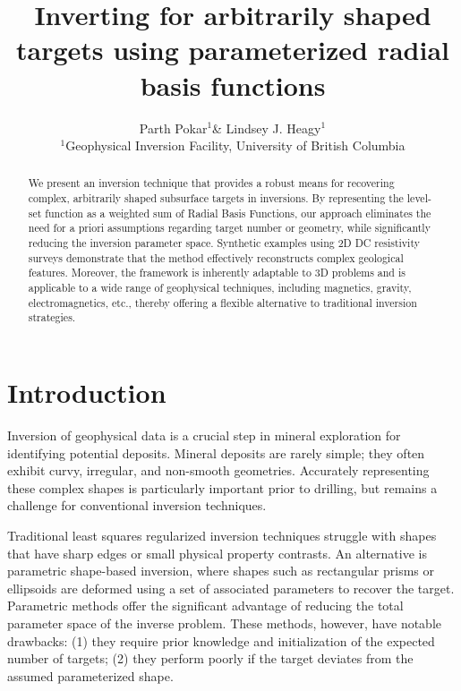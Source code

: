 \documentclass{segabs}
\begin{document}
\title{Inverting for arbitrarily shaped targets using parameterized radial basis functions}

\author{
    Parth Pokar$^1$\& Lindsey J. Heagy$^1$ \\
    $^1$Geophysical Inversion Facility, University of British Columbia \\
}


\maketitle
\begin{abstract}
\vspace{-0.6cm}

We present an inversion technique that provides a robust means for recovering complex, arbitrarily shaped subsurface targets in inversions. By representing the level-set function as a weighted sum of Radial Basis Functions, our approach eliminates the need for a priori assumptions regarding target number or geometry, while significantly reducing the inversion parameter space. Synthetic examples using 2D DC resistivity surveys demonstrate that the method effectively reconstructs complex geological features. Moreover, the framework is inherently adaptable to 3D problems and is applicable to a wide range of geophysical techniques, including magnetics, gravity, electromagnetics, etc., thereby offering a flexible alternative to traditional inversion strategies.
\end{abstract}

\vspace{-0.45cm}
\section{Introduction}
\vspace{-0.25cm}

Inversion of geophysical data is a crucial step in mineral exploration for identifying potential deposits. Mineral deposits are rarely simple; they often exhibit curvy, irregular, and non-smooth geometries. Accurately representing these complex shapes is particularly important prior to drilling, but remains a challenge for conventional inversion techniques.

Traditional least squares regularized inversion techniques struggle with shapes that have sharp edges or small physical property contrasts. An alternative is parametric shape-based inversion, where shapes such as rectangular prisms \citep{belliveau_parametric_2023} or ellipsoids \citep{mcmillan_3d_2015} are deformed using a set of associated parameters to recover the target. Parametric methods offer the significant advantage of reducing the total parameter space of the inverse problem. These methods, however, have notable drawbacks: (1) they require prior knowledge and initialization of the expected number of targets; (2) they perform poorly if the target deviates from the assumed parameterized shape.
\end{document}
